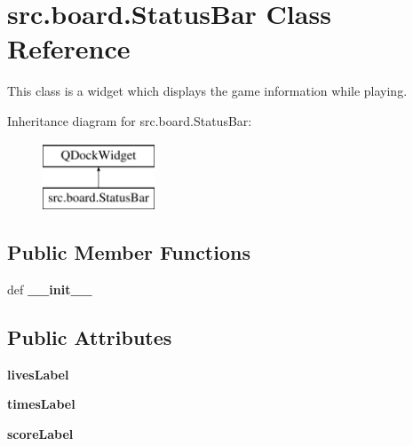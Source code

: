\hypertarget{classsrc_1_1board_1_1_status_bar}{}\section{src.\+board.\+Status\+Bar Class Reference}
\label{classsrc_1_1board_1_1_status_bar}


This class is a widget which displays the game information while playing.  


Inheritance diagram for src.\+board.\+Status\+Bar\+:\begin{figure}[H]
\begin{center}
\leavevmode
\includegraphics[height=2.000000cm]{classsrc_1_1board_1_1_status_bar}
\end{center}
\end{figure}
\subsection*{Public Member Functions}
\begin{DoxyCompactItemize}
\item 
\hypertarget{classsrc_1_1board_1_1_status_bar_a1f6a41d63501b4eb012a19c243b2cc5b}{}def {\bfseries \+\_\+\+\_\+init\+\_\+\+\_\+}\label{classsrc_1_1board_1_1_status_bar_a1f6a41d63501b4eb012a19c243b2cc5b}

\end{DoxyCompactItemize}
\subsection*{Public Attributes}
\begin{DoxyCompactItemize}
\item 
\hypertarget{classsrc_1_1board_1_1_status_bar_ad91d18f7e226872ae73eef0d347ee5d0}{}{\bfseries lives\+Label}\label{classsrc_1_1board_1_1_status_bar_ad91d18f7e226872ae73eef0d347ee5d0}

\item 
\hypertarget{classsrc_1_1board_1_1_status_bar_a3055230ea568f64edd37decdc4c6dee9}{}{\bfseries times\+Label}\label{classsrc_1_1board_1_1_status_bar_a3055230ea568f64edd37decdc4c6dee9}

\item 
\hypertarget{classsrc_1_1board_1_1_status_bar_a56605adb92e53a3cb03a73c1bb6ada29}{}{\bfseries score\+Label}\label{classsrc_1_1board_1_1_status_bar_a56605adb92e53a3cb03a73c1bb6ada29}

\end{DoxyCompactItemize}


